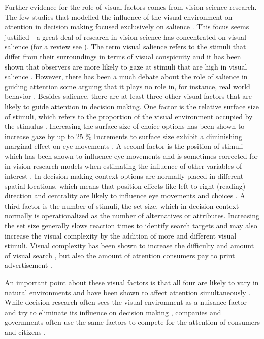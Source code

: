 \documentclass{article}
\begin{document}
Further evidence for the role of visual factors comes from vision science research. The few studies that modelled the influence of the visual environment on attention in decision making focused exclusively on salience \citep{chen2013,navalpakkam2010, towal2013a}. This focus seems justified - a great deal of research in vision science has concentrated on visual salience (for a review see \cite{borji2012a}). The term visual salience refers to the stimuli that differ from their surroundings in terms of visual conspicuity and it has been shown that observers are more likely to gaze at stimuli that are high in visual salience \cite{itti2000}. However, there has been a much debate about the role of salience in guiding attention some arguing that it plays no role in, for instance, real world behavior \citep{tatler2011a}. Besides salience, there are at least three other visual factors that are likely to guide attention in decision making. 
One factor is the relative surface size of stimuli, which refers to the proportion of the visual environment occupied by the stimulus \citep[for a review see][]{peschel2013a}. Increasing the surface size of choice options has been shown to increase gaze by up to 25 \% \citep{chandon2009a} Increments to surface size exhibit a diminishing marginal effect on eye movements \citep{lohse1997a}. A second factor is the position of stimuli which has been shown to influence eye movements and is sometimes corrected for in vision research models when estimating the influence of other variables of interest \citep{clarke2014a}. In decision making context options are normally placed in different spatial locations, which means that position effects like left-to-right (reading) direction and centrality are likely to influence eye movements and choices \citep{atalay2012a, meissner2016a}. A third factor is the number of stimuli, the set size, which in decision context normally is operationalized as the number of alternatives or attributes. Increasing the set size generally slows reaction times to identify search targets \citep{wolfe2010} and may also increase the visual complexity by the addition of more and different visual stimuli. Visual complexity has been shown to increase the difficulty and amount of visual search \citep{rosenholtz2007a}, but also the amount of attention consumers pay to print advertisement \citep{pieters2010a}. 

An important point about these visual factors is that all four are likely to vary in natural environments and have been shown to affect attention simultaneously \citep{orquin2019a}. While decision research often sees the visual environment as a nuisance factor and try to eliminate its influence on decision making \citep{brandstatter2014, gloeckner2011a, perkovic2018}, companies and governments often use the same factors to compete for the attention of consumers and citizens \citep{pieters2017, orquinwedel2020}.   
\end{document}
